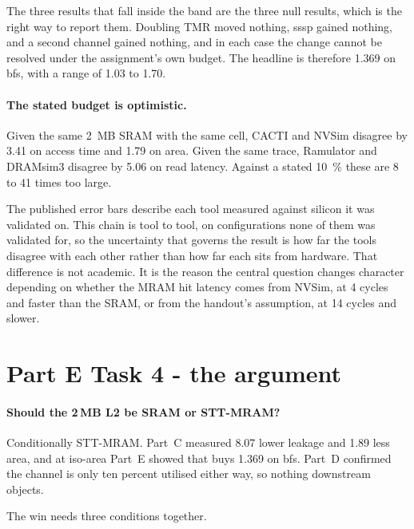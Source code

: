 \documentclass[9pt,a4paper]{extarticle}
\begin{document}
The three results that fall inside the band are the three null results,
which is the right way to report them. Doubling TMR moved nothing, sssp
gained nothing, and a second channel gained nothing, and in each case the
change cannot be resolved under the assignment's own budget. The headline
is therefore \SI{1.369}{\times} on bfs, with a range of 1.03 to 1.70.

\paragraph{The stated budget is optimistic.}

Given the same \SI{2}{MB} SRAM with the same cell, CACTI and NVSim
disagree by \SI{3.41}{\times} on access time and \SI{1.79}{\times} on
area. Given the same trace, Ramulator and DRAMsim3 disagree by
\SI{5.06}{\times} on read latency. Against a stated \SI{10}{\percent}
these are 8 to 41 times too large.

The published error bars describe each tool measured against silicon it
was validated on. This chain is tool to tool, on configurations none of
them was validated for, so the uncertainty that governs the result is how
far the tools disagree with each other rather than how far each sits from
hardware. That difference is not academic. It is the reason the central
question changes character depending on whether the MRAM hit latency comes
from NVSim, at 4 cycles and faster than the SRAM, or from the handout's
assumption, at 14 cycles and slower.







\section{Part E Task 4 - the argument}

\paragraph{Should the 2\,MB L2 be SRAM or STT-MRAM?}

Conditionally STT-MRAM. Part~C measured \SI{8.07}{\times} lower leakage
and \SI{1.89}{\times} less area, and at iso-area Part~E showed that buys
\SI{1.369}{\times} on bfs. Part~D confirmed the channel is only ten
percent utilised either way, so nothing downstream objects.

The win needs three conditions together.
\end{document}
